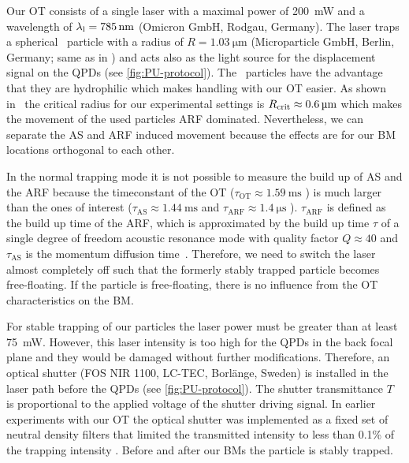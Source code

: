 Our OT consists of a single laser with a maximal power of \SI{200}{\milli\watt} 
and a wavelength of $\llaser = \SI{785}{\nm}$ (Omicron GmbH, Rodgau, Germany). 
The laser traps a spherical \SiO~particle with a radius of $R=\SI{1.03}{\um}$ 
(Microparticle GmbH, Berlin, Germany; same as in \cite{Goering2021}) and acts 
also as the light source for the displacement signal on the QPDs (see 
\cref{fig:PU-protocol}). The \SiO~particles have the advantage that they are 
hydrophilic which makes handling with our OT easier. As shown 
in~\cite{Goering2021} the critical radius for our experimental settings is 
$R_{\mathrm{crit}}\approx\SI{0.6}{\si{\micro\meter}}$ which makes the movement of the used particles ARF 
dominated. Nevertheless, we can separate the AS and ARF induced movement 
because the effects are for our BM locations orthogonal to each other.

In the normal trapping mode it is not possible to measure the build up of AS 
and the ARF because the timeconstant of the OT ($\tau_{\mathrm{OT}}\approx 
\SI{1.59}{\ms}$ \cite{Goering2021}) is much larger than the ones of interest 
($\tau_{\mathrm{AS}}\approx \SI{1.44}{\ms}$ and $\tau_{\mathrm{ARF}}\approx 
\SI{1.4}{\us}$ \cite{Goering2021}). $\tau_{\mathrm{ARF}}$ is defined as the 
build up time of the ARF, which is approximated by the build up time $\tau$ of 
a single degree of freedom acoustic resonance mode with quality factor 
$Q\approx 40$ and $\tau_{\mathrm{AS}}$ is the momentum diffusion 
time~\cite{Muller2015}. Therefore, we need to switch the laser almost 
completely off such that the formerly stably trapped particle becomes 
free-floating. If the particle is free-floating, there is no influence from the 
OT characteristics on the BM.

For stable trapping of our particles the laser power must be greater than at 
least \SI{75}{\milli\watt}. However, this laser intensity is too high for the 
QPDs in the back focal plane and they would be damaged without further 
modifications. Therefore, an optical shutter (FOS NIR 1100, LC-TEC, Borlänge, 
Sweden) is installed in the laser path before the QPDs (see 
\cref{fig:PU-protocol}). The shutter transmittance $T$ is proportional to the 
applied voltage of the shutter driving signal. In earlier experiments with our 
OT the optical shutter was implemented as a fixed set of neutral density 
filters that limited the transmitted intensity to less than 0.1\% of the 
trapping intensity \cite{Lakaemper2015,Lamprecht2016,Lamprecht2021}. Before and 
after our BMs the particle is stably trapped.

